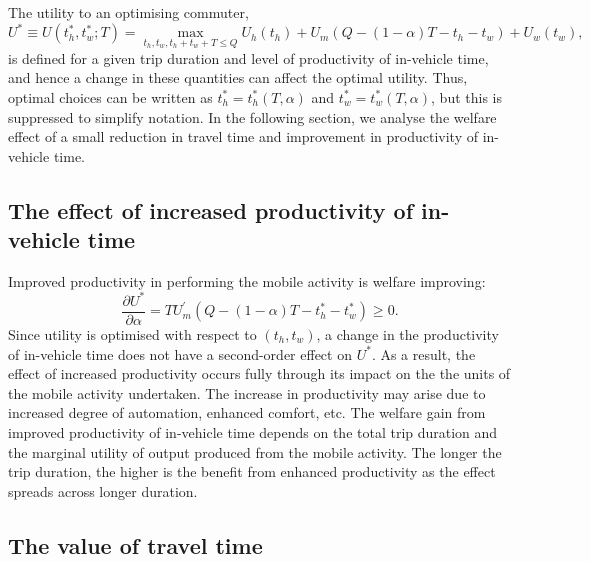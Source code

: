 \documentclass[12pt,a4paper,british]{article}
\begin{document}
The utility to an optimising commuter,%
\begin{equation}
U^{\ast}\equiv U\left(t_{h}^{\ast},t_{w}^{\ast};T\right)=\max_{t_{h},t_{w},t_{h}+t_{w}+T\leq Q}U_{h}\left(t_{h}\right)+U_{m}\left(Q-\left(1-\alpha\right)T-t_{h}-t_{w}\right)+U_{w}\left(t_{w}\right),
\label{eq:UStarDet}
\end{equation}
is defined for a given trip duration and level of productivity of in-vehicle time, and hence a change in these quantities can affect the optimal utility. Thus, optimal choices can be written as $t_h^{\ast}= t_h^{\ast} \left(T, \alpha \right)$ and $t_w^{\ast} = t_w^{\ast} \left(T, \alpha \right)$, but this is suppressed to simplify notation. In the following section, we analyse the welfare effect of a small reduction in travel time and improvement in productivity of in-vehicle time. %


\subsection*{The effect of increased productivity of in-vehicle time}

Improved productivity in performing the mobile activity is welfare improving:%
\begin{equation*}
    \frac{\partial U^{\ast}}{\partial \alpha} = T U^{\prime}_m\left( Q-\left(1-\alpha\right)T-t_{h}^{\ast}-t_{w}^{\ast} \right) \geq 0.
\end{equation*}
Since utility is optimised with respect to $\left(t_{h},t_{w}\right)$, a change in the productivity of in-vehicle time does not have a second-order effect on $U^{\ast}$. As a result, the effect of increased productivity occurs fully through its impact on the the units of the mobile activity undertaken. The increase in productivity may arise due to increased degree of automation, enhanced comfort, etc. The welfare gain from improved productivity of in-vehicle time depends on the total trip duration and the marginal utility of output produced from the mobile activity. The longer the trip duration, the higher is the benefit from enhanced productivity as the effect spreads across longer duration.


\subsection*{The value of travel time}
\end{document}
